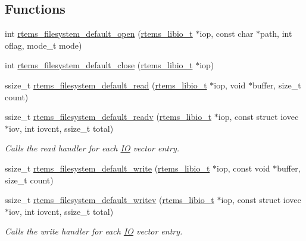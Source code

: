 \subsection*{Functions}
\begin{DoxyCompactItemize}
\item 
int \mbox{\hyperlink{group__LibIOFSHandler_gadcd852d4f67d04301d03fc9104730389}{rtems\+\_\+filesystem\+\_\+default\+\_\+open}} (\mbox{\hyperlink{structrtems__libio__tt}{rtems\+\_\+libio\+\_\+t}} $\ast$iop, const char $\ast$path, int oflag, mode\+\_\+t mode)
\item 
int \mbox{\hyperlink{group__LibIOFSHandler_gacc910eacfd4ffb5ba69d8ff0380d5f65}{rtems\+\_\+filesystem\+\_\+default\+\_\+close}} (\mbox{\hyperlink{structrtems__libio__tt}{rtems\+\_\+libio\+\_\+t}} $\ast$iop)
\item 
ssize\+\_\+t \mbox{\hyperlink{group__LibIOFSHandler_gad453e9f1320d2c20ac2966e327e9c351}{rtems\+\_\+filesystem\+\_\+default\+\_\+read}} (\mbox{\hyperlink{structrtems__libio__tt}{rtems\+\_\+libio\+\_\+t}} $\ast$iop, void $\ast$buffer, size\+\_\+t count)
\item 
ssize\+\_\+t \mbox{\hyperlink{group__LibIOFSHandler_ga9e051f16ae657b119d54bffc29baffeb}{rtems\+\_\+filesystem\+\_\+default\+\_\+readv}} (\mbox{\hyperlink{structrtems__libio__tt}{rtems\+\_\+libio\+\_\+t}} $\ast$iop, const struct iovec $\ast$iov, int iovcnt, ssize\+\_\+t total)
\begin{DoxyCompactList}\small\item\em Calls the read handler for each \mbox{\hyperlink{structIO}{IO}} vector entry. \end{DoxyCompactList}\item 
ssize\+\_\+t \mbox{\hyperlink{group__LibIOFSHandler_gaf4201385a0dd5ad3d1f447b3a167b106}{rtems\+\_\+filesystem\+\_\+default\+\_\+write}} (\mbox{\hyperlink{structrtems__libio__tt}{rtems\+\_\+libio\+\_\+t}} $\ast$iop, const void $\ast$buffer, size\+\_\+t count)
\item 
ssize\+\_\+t \mbox{\hyperlink{group__LibIOFSHandler_ga9ac1157e2bd2cff626d67f67a6376a8f}{rtems\+\_\+filesystem\+\_\+default\+\_\+writev}} (\mbox{\hyperlink{structrtems__libio__tt}{rtems\+\_\+libio\+\_\+t}} $\ast$iop, const struct iovec $\ast$iov, int iovcnt, ssize\+\_\+t total)
\begin{DoxyCompactList}\small\item\em Calls the write handler for each \mbox{\hyperlink{structIO}{IO}} vector entry. \end{DoxyCompactList}\item 

\end{DoxyCompactItemize}
